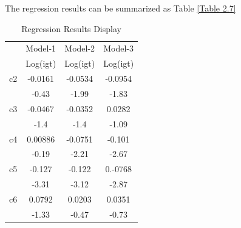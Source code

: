 The regression results can be summarized as Table \ref*{Table 2.7}
\begin{table}[H]
    \centering
    \caption{Regression Results Display}
    \begin{tabular}{cccc}
        \toprule
                                        & \multicolumn{1}{p{7.645em}}{Model-1}  & \multicolumn{1}{p{7.5em}}{Model-2}  & \multicolumn{1}{p{8.07em}}{Model-3}  \\
                                        & \multicolumn{1}{p{7.645em}}{Log(igt)} & \multicolumn{1}{p{7.5em}}{Log(igt)} & \multicolumn{1}{p{8.07em}}{Log(igt)} \\
        \midrule
        \multicolumn{1}{p{6.93em}}{c2}  & -0.0161                               & -0.0534                             & -0.0954                              \\
                                        & -0.43                                 & -1.99                               & -1.83                                \\
        \multicolumn{1}{p{6.93em}}{c3}  & -0.0467                               & -0.0352                             & 0.0282                               \\
                                        & -1.4                                  & -1.4                                & -1.09                                \\
        \multicolumn{1}{p{6.93em}}{c4}  & 0.00886                               & -0.0751                             & -0.101                               \\
                                        & -0.19                                 & -2.21                               & -2.67                                \\
        \multicolumn{1}{p{6.93em}}{c5}  & -0.127                                & -0.122                              & 0.-0768                              \\
                                        & -3.31                                 & -3.12                               & -2.87                                \\
        \multicolumn{1}{p{6.93em}}{c6}  & 0.0792                                & 0.0203                              & 0.0351                               \\
                                        & -1.33                                 & -0.47                               & -0.73                                \\

\end{tabular}
\end{table}
